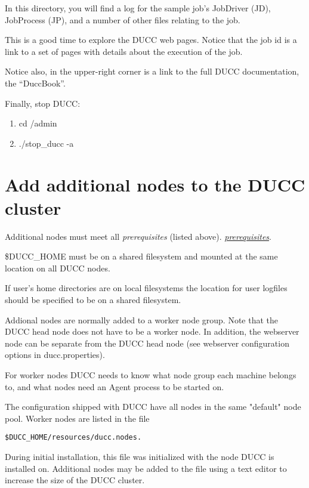     In this directory, you will find a log for the sample job's JobDriver (JD), JobProcess (JP), and
    a number of other files relating to the job.

    This is a good time to explore the DUCC web pages.  Notice that the job id is a link to a set of
    pages with details about the execution of the job.

    Notice also, in the upper-right corner is a link to the full DUCC documentation, the ``DuccBook''.

    Finally, stop DUCC:
    \begin{enumerate}
      \item cd \duccruntime/admin
      \item./stop\_ducc -a
      \end{enumerate}
      

\section{Add additional nodes to the DUCC cluster}
   Additional nodes must meet all 
   \ifdefined\DUCCSTANDALONE
   {\em prerequisites} (listed above).
   \else
   \hyperref[sec:install.prerequisites]{\em prerequisites}.
   \fi

   \$DUCC\_HOME must be on a shared filesystem and mounted at the same location
   on all DUCC nodes.

   If user's home directories are on local filesystems the location for user logfiles
   should be specified to be on a shared filesystem. 

   Addional nodes are normally added to a worker node group. Note that the
   DUCC head node does not have to be a worker node.
   In addition, the webserver node can be separate from the DUCC head node 
   (see webserver configuration options in ducc.properties).

   For worker nodes DUCC needs to know what node group
   each machine belongs to, and what nodes need an Agent process to be started on.

   The configuration shipped with DUCC have all nodes in the same "default" node pool.
   Worker nodes are listed in the file
\begin{verbatim}
$DUCC_HOME/resources/ducc.nodes.  
\end{verbatim}
   
   During initial installation, this file was initialized with the node DUCC is installed on.
   Additional nodes may be added to the file using a text editor to increase the size of the DUCC
   cluster.


